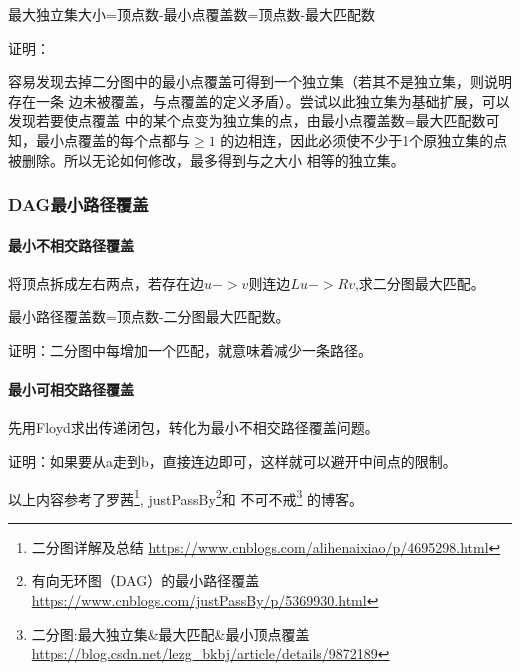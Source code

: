 \begin{theorem}
	最大独立集大小=顶点数-最小点覆盖数=顶点数-最大匹配数
\end{theorem}

证明：

容易发现去掉二分图中的最小点覆盖可得到一个独立集（若其不是独立集，则说明存在一条
边未被覆盖，与点覆盖的定义矛盾）。尝试以此独立集为基础扩展，可以发现若要使点覆盖
中的某个点变为独立集的点，由最小点覆盖数=最大匹配数可知，最小点覆盖的每个点都与$\geq 1$
的边相连，因此必须使不少于1个原独立集的点被删除。所以无论如何修改，最多得到与之大小
相等的独立集。

\subsubsection{DAG最小路径覆盖}

\paragraph{最小不相交路径覆盖}

将顶点拆成左右两点，若存在边$u->v$则连边$Lu->Rv$,求二分图最大匹配。

\begin{theorem}
	最小路径覆盖数=顶点数-二分图最大匹配数。
\end{theorem}

证明：二分图中每增加一个匹配，就意味着减少一条路径。

\paragraph{最小可相交路径覆盖}

先用Floyd求出传递闭包，转化为最小不相交路径覆盖问题。

证明：如果要从a走到b，直接连边即可，这样就可以避开中间点的限制。

以上内容参考了罗茜\footnote{二分图详解及总结
	\url{https://www.cnblogs.com/alihenaixiao/p/4695298.html}},
justPassBy\footnote{有向无环图（DAG）的最小路径覆盖
	\url{https://www.cnblogs.com/justPassBy/p/5369930.html}}和
不可不戒\footnote{二分图:最大独立集\&最大匹配\&最小顶点覆盖
	\url{https://blog.csdn.net/lezg\_bkbj/article/details/9872189}}
的博客。
